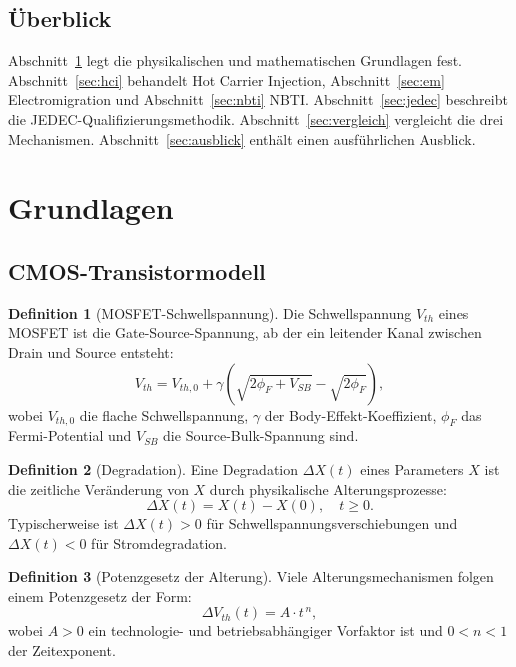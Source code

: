 ﻿\documentclass[a4paper,12pt]{article}
\theoremstyle{definition}
\newtheorem{definition}{Definition}
\begin{document}
\subsection{Überblick}

Abschnitt~\ref{sec:grundlagen} legt die physikalischen und mathematischen
Grundlagen fest. Abschnitt~\ref{sec:hci} behandelt Hot Carrier Injection,
Abschnitt~\ref{sec:em} Electromigration und Abschnitt~\ref{sec:nbti} NBTI.
Abschnitt~\ref{sec:jedec} beschreibt die JEDEC-Qualifizierungsmethodik.
Abschnitt~\ref{sec:vergleich} vergleicht die drei Mechanismen.
Abschnitt~\ref{sec:ausblick} enthält einen ausführlichen Ausblick.

\section{Grundlagen}
\label{sec:grundlagen}

\subsection{CMOS-Transistormodell}

\begin{definition}[MOSFET-Schwellspannung]
	Die Schwellspannung $V_{th}$ eines MOSFET ist die Gate-Source-Spannung,
	ab der ein leitender Kanal zwischen Drain und Source entsteht:
	\[
	V_{th} = V_{th,0} + \gamma\!\left(\sqrt{2\phi_F + V_{SB}} - \sqrt{2\phi_F}\right),
	\]
	wobei $V_{th,0}$ die flache Schwellspannung, $\gamma$ der Body-Effekt-Koeffizient,
	$\phi_F$ das Fermi-Potential und $V_{SB}$ die Source-Bulk-Spannung sind.
\end{definition}

\begin{definition}[Degradation]
	Eine Degradation $\Delta X(t)$ eines Parameters $X$ ist die zeitliche
	Veränderung von $X$ durch physikalische Alterungsprozesse:
	\[
	\Delta X(t) = X(t) - X(0), \quad t \geq 0.
	\]
	Typischerweise ist $\Delta X(t) > 0$ für Schwellspannungsverschiebungen
	und $\Delta X(t) < 0$ für Strom\-degradation.
\end{definition}

\begin{definition}[Potenzgesetz der Alterung]
	Viele Alterungsmechanismen folgen einem Potenzgesetz der Form:
	\[
	\Delta V_{th}(t) = A \cdot t^{\,n},
	\]
	wobei $A > 0$ ein technologie- und betriebsabhängiger Vorfaktor ist
	und $0 < n < 1$ der Zeitexponent.
\end{definition}
\end{document}
